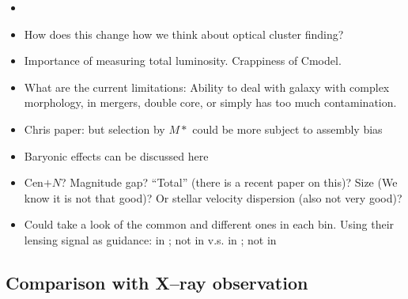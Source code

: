 \documentclass[a4paper,fleqn,usenatbib]{mnras}
\begin{document}
    \begin{itemize}

        \item {}

        \item How does this change how we think about optical cluster finding?

        \item Importance of measuring total luminosity. Crappiness of Cmodel.

        \item What are the current limitations: Ability to deal with galaxy with complex
            morphology, in mergers, double core, or simply has too much contamination.


        \item Chris paper: but selection by $M*$ could be more subject to assembly bias

        \item Baryonic effects can be discussed here

        \item Cen$+N$? Magnitude gap? ``Total'' \mstar{} (there is a recent paper on this)?
            Size (We know it is not that good)? Or stellar velocity dispersion (also not very good)?

        \item Could take a look of the common and different ones in each bin. Using their
            lensing signal as guidance: in \redm{}; not in \mstar{} v.s. in \mstar{}; not in \redm{}

    \end{itemize}

\subsection{Comparison with X--ray observation}
    \label{sec:xray}

\end{document}

